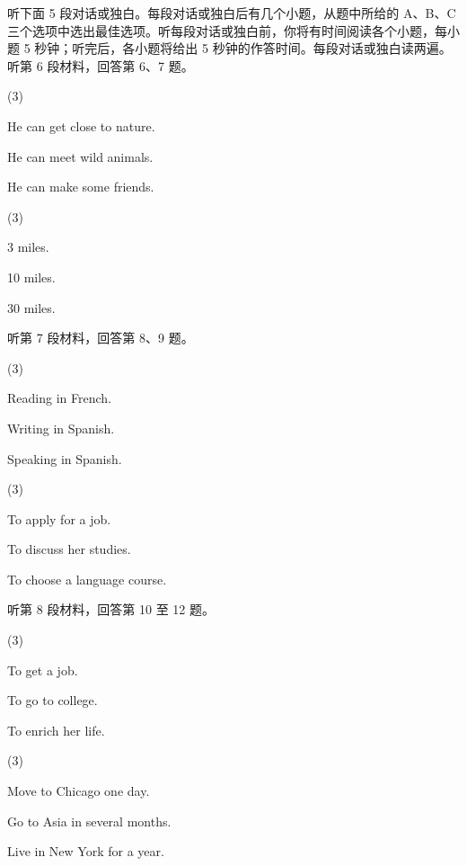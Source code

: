 \documentclass{英语试卷}
\begin{document}
\par 听下面 5 段对话或独白。每段对话或独白后有几个小题，从题中所给的 A、B、C 三个选项中选出最佳选项。听每段对话或独白前，你将有时间阅读各个小题，每小题 5 秒钟；听完后，各小题将给出 5 秒钟的作答时间。每段对话或独白读两遍。 听第 6 段材料，回答第 6、7 题。\par
{}
\begin{choices}(3)
  \item He can get close to nature.
  \item He can meet wild animals.
  \item He can make some friends.
\end{choices}
\begin{choices}(3)
  \item 3 miles.
  \item 10 miles.
  \item 30 miles.
\end{choices}
\par 听第 7 段材料，回答第 8、9 题。\par
{}
\begin{choices}(3)
  \item Reading in French.
  \item Writing in Spanish.
  \item Speaking in Spanish.
\end{choices}
\begin{choices}(3)
  \item To apply for a job.
  \item To discuss her studies.
  \item To choose a language course.
\end{choices}
\par 听第 8 段材料，回答第 10 至 12 题。\par
{}
\begin{choices}(3)
  \item To get a job.
  \item To go to college.
  \item To enrich her life.
\end{choices}
\begin{choices}(3)
  \item Move to Chicago one day.
  \item Go to Asia in several months.
  \item Live in New York for a year.
\end{choices}
\end{document}
